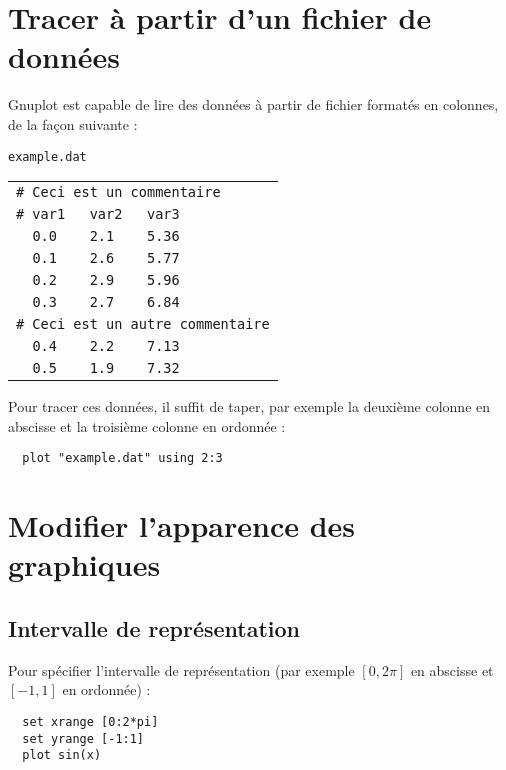 \documentclass [a4paper]{article}
\begin{document}
\section{Tracer à partir d'un fichier de données}

\noindent
Gnuplot est capable de lire des données à partir de fichier formatés en colonnes, de la façon suivante :

\begin{center}
    \verb?example.dat?\\
\begin{tabular}{|l|}
    \hline
    \verb?# Ceci est un commentaire?\\
    \verb?# var1   var2   var3?\\
    \verb?  0.0    2.1    5.36?\\
    \verb?  0.1    2.6    5.77?\\
    \verb?  0.2    2.9    5.96?\\
    \verb?  0.3    2.7    6.84?\\
    \verb?# Ceci est un autre commentaire?\\
    \verb?  0.4    2.2    7.13?\\
    \verb?  0.5    1.9    7.32?\\
    \hline
\end{tabular}
\end{center}

\noindent
Pour tracer ces données, il suffit de taper, par exemple la deuxième colonne en abscisse et la troisième colonne en ordonnée :

\begin{verbatim}
  plot "example.dat" using 2:3
\end{verbatim}

\section{Modifier l'apparence des graphiques}

\subsection{Intervalle de représentation}

\noindent
Pour spécifier l'intervalle de représentation (par exemple $[0, 2\pi]$ en abscisse et $[-1,1]$ en ordonnée) :
\begin{verbatim}
  set xrange [0:2*pi]
  set yrange [-1:1]
  plot sin(x)
\end{verbatim}
\end{document}
